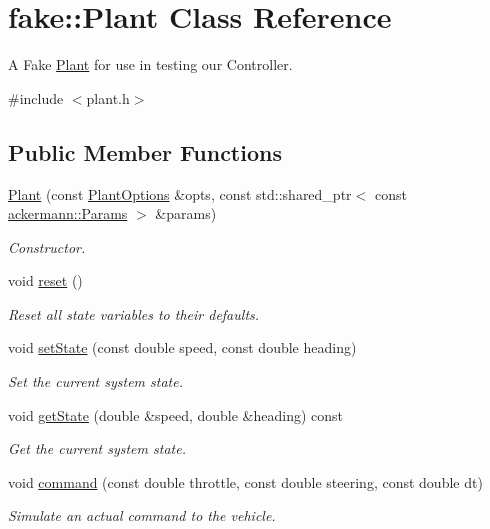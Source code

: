 \hypertarget{classfake_1_1_plant}{}\section{fake\+:\+:Plant Class Reference}
\label{classfake_1_1_plant}


A Fake \hyperlink{classfake_1_1_plant}{Plant} for use in testing our Controller.  




{\ttfamily \#include $<$plant.\+h$>$}

\subsection*{Public Member Functions}
\begin{DoxyCompactItemize}
\item 
\hyperlink{classfake_1_1_plant_a346cd2379207256138a0996960461d16}{Plant} (const \hyperlink{structfake_1_1_plant_options}{Plant\+Options} \&opts, const std\+::shared\+\_\+ptr$<$ const \hyperlink{structackermann_1_1_params}{ackermann\+::\+Params} $>$ \&params)
\begin{DoxyCompactList}\small\item\em Constructor. \end{DoxyCompactList}\item 
\mbox{\label{classfake_1_1_plant_ac63a7c00709fdffe2318ed429e1f351c}} 
void \hyperlink{classfake_1_1_plant_ac63a7c00709fdffe2318ed429e1f351c}{reset} ()
\begin{DoxyCompactList}\small\item\em Reset all state variables to their defaults. \end{DoxyCompactList}\item 
void \hyperlink{classfake_1_1_plant_aa6f602aaabebcc84a03c2ae7a4878c05}{set\+State} (const double speed, const double heading)
\begin{DoxyCompactList}\small\item\em Set the current system state. \end{DoxyCompactList}\item 
void \hyperlink{classfake_1_1_plant_a65ac487259b9dc0e30f6495f5f5c0453}{get\+State} (double \&speed, double \&heading) const
\begin{DoxyCompactList}\small\item\em Get the current system state. \end{DoxyCompactList}\item 
void \hyperlink{classfake_1_1_plant_a51e4596f215bec72d55bc4b4a568b8b0}{command} (const double throttle, const double steering, const double dt)
\begin{DoxyCompactList}\small\item\em Simulate an actual command to the vehicle. \end{DoxyCompactList}\end{DoxyCompactItemize}


